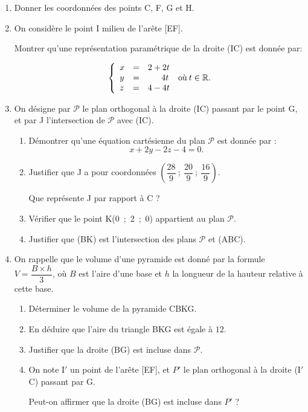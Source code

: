 \documentclass[10pt]{article}
\providecommand{\R}{\mathbb{R}}
\begin{document}
\begin{enumerate}
\item Donner les coordonnées des points C, F{}, G et H.
\item On considère le point I milieu de l'arête [EF].

Montrer qu'une représentation paramétrique de la droite (IC) est donnée par: 

\[\left\{\begin{array}{l c l}
x &=&2+2t\\
y &=&\phantom{2 +~}4t\\
z &=&4 - 4t
\end{array}\right.\:\text{où} \:  t \in \R.\]

\item On désigne par $\mathcal{P}$ le plan orthogonal à la droite (IC) passant par le point G, et par J l'intersection de $\mathcal{P}$ avec (IC).
	\begin{enumerate}
		\item Démontrer qu'une équation cartésienne du plan $\mathcal{P}$ est donnée par : 
		\[x + 2y - 2z - 4 = 0.\]
		\item Justifier que J a pour coordonnées $\left(\dfrac{28}{9}~;~\dfrac{20}{9}~;~\dfrac{16}{9}\right)$.
		
Que représente J par rapport à C ? 
		\item Vérifier que le point K(0~;~2~;~0) appartient au plan $\mathcal{P}$.
		\item Justifier que (BK) est l'intersection des plans $\mathcal{P}$ et (ABC).
	\end{enumerate}
\item On rappelle que le volume d'une pyramide est donné par la formule $V = \dfrac{B \times h}{3}$, où $B$ est l'aire d'une base et $h$ la longueur de la hauteur relative à cette base.
	\begin{enumerate}
		\item Déterminer le volume de la pyramide CBKG.
		\item En déduire que l'aire du triangle BKG est égale à $12$.
		\item Justifier que la droite (BG) est incluse dans $\mathcal{P}$.
		\item On note I$'$ un point de l'arête [EF], et $P'$ le plan orthogonal à la droite (I$'$ C) passant par G.
		
Peut-on affirmer que la droite (BG) est incluse dans $P'$ ?
	\end{enumerate}
\end{enumerate}

\bigskip
\end{document}
